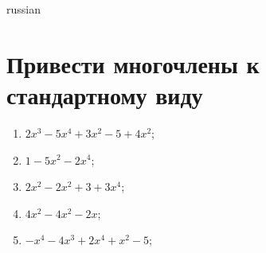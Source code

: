 \documentclass[a4paper]{article}
\begin{document}
\begin{otherlanguage*}{russian}

\section{Привести многочлены к стандартному виду}
\begin{enumerate}
\item $2x^{3} - 5x^{4} + 3x^{2} - 5 + 4x^{2}$;
\item $1 - 5x^{2} - 2x^{4}$;
\item $2x^{2} - 2x^{2} + 3 + 3x^{4}$;
\item $4x^{2} - 4x^{2} - 2x$;
\item $-x^{4} - 4x^{3} + 2x^{4} + x^{2} - 5$;
\end{enumerate}
\end{otherlanguage*}
\end{document}
